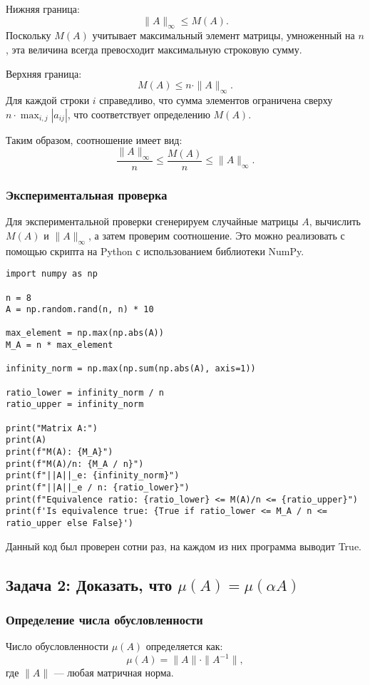 Нижняя граница:
\[
\|A\|_\infty \leq M(A).
\]
Поскольку $M(A)$ учитывает максимальный элемент матрицы, умноженный на $n$, эта величина всегда превосходит максимальную строковую сумму.

Верхняя граница:
\[
M(A) \leq n \cdot \|A\|_\infty.
\]
Для каждой строки $i$ справедливо, что сумма элементов ограничена сверху $n \cdot \max_{i,j}|a_{ij}|$, что соответствует определению $M(A)$.

Таким образом, соотношение имеет вид:
\[
\frac{\|A\|_\infty}{n} \leq \frac{M(A)}{n} \leq \|A\|_\infty.
\]

\subsubsection*{Экспериментальная проверка}
Для экспериментальной проверки сгенерируем случайные матрицы $A$, вычислить $M(A)$ и $\|A\|_\infty$, а затем проверим соотношение. Это можно реализовать с помощью скрипта на Python с использованием библиотеки NumPy.

\begin{lstlisting}[caption={Задача 1}]
import numpy as np

n = 8
A = np.random.rand(n, n) * 10

max_element = np.max(np.abs(A))
M_A = n * max_element

infinity_norm = np.max(np.sum(np.abs(A), axis=1))

ratio_lower = infinity_norm / n
ratio_upper = infinity_norm

print("Matrix A:")
print(A)
print(f"M(A): {M_A}")
print(f"M(A)/n: {M_A / n}")
print(f"||A||_e: {infinity_norm}")
print(f"||A||_e / n: {ratio_lower}")
print(f"Equivalence ratio: {ratio_lower} <= M(A)/n <= {ratio_upper}")
print(f'Is equivalence true: {True if ratio_lower <= M_A / n <= ratio_upper else False}')
\end{lstlisting}

Данный код был проверен сотни раз, на каждом из них программа выводит True.


\newpage
\subsection*{Задача 2: Доказать, что $\mu(A) = \mu(\alpha A)$}

\subsubsection*{Определение числа обусловленности}
Число обусловленности $\mu(A)$ определяется как:
\[
\mu(A) = \|A\| \cdot \|A^{-1}\|,
\]
где $\| A \|$ --- любая матричная норма.

